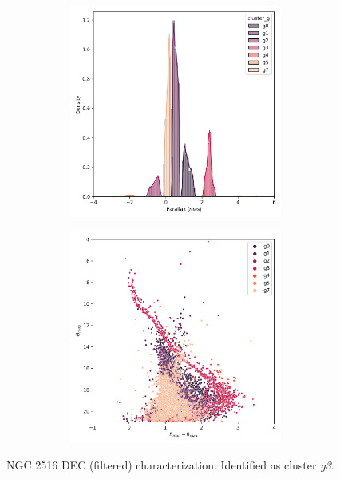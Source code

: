 \documentclass[11pt, a4paper, english]{book}
\begin{document}
\begin{figure}[H]
\begin{subfigure}{0.9\textwidth}
\begin{subfigure}[t]{0.30\textwidth}
    \end{subfigure}
    \hfill
    \begin{subfigure}[t]{0.30\textwidth}
      \centering
      \includegraphics[width=\textwidth]{../figures/ngc_2516/dec_parallax_filtered_ngc_2516.png}
    \end{subfigure}
    \hfill
    \begin{subfigure}[t]{0.30\textwidth}
      \centering
      \includegraphics[width=\textwidth]{../figures/ngc_2516/dec_hr_diagram_filtered_ngc_2516.png}
    \end{subfigure}
  \end{subfigure}
  \caption{NGC 2516 DEC (filtered) characterization. Identified as cluster \emph{g3}.}
  \label{fig:result_ngc_2516_dec_filtered}
\end{figure}
\end{document}
